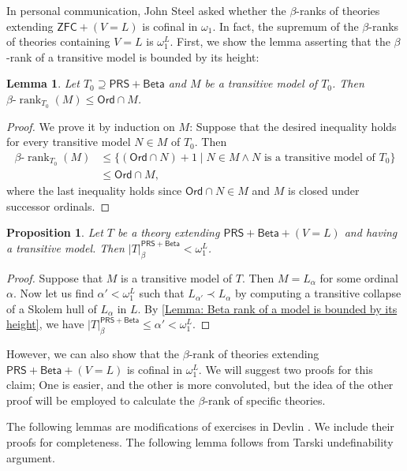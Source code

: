 \documentclass{amsart}
\newtheorem{lemma}[theorem]{Lemma}
\newtheorem{proposition}[proposition]{Proposition}
\theoremstyle{remark}
\newcommand{\PRS}{\mathsf{PRS}}
\newcommand{\Beta}{\mathsf{Beta}}
\newcommand{\betarank}{\beta\text{-}\operatorname{rank}}
\newcommand{\Ord}{\mathsf{Ord}}
\newcommand{\ZFC}{\mathsf{ZFC}}
\begin{document}
In personal communication, John Steel asked whether the $\beta$-ranks of theories extending $\ZFC + (V=L)$ is cofinal in $\omega_1$. In fact, the supremum of the $\beta$-ranks of theories containing $V=L$ is $\omega_1^L$. First, we show the lemma asserting that the $\beta$-rank of a transitive model is bounded by its height:
\begin{lemma} \label{Lemma: Beta rank of a model is bounded by its height}
    Let $T_0 \supseteq \PRS + \mathsf{Beta}$ and $M$ be a transitive model of $T_0$. Then $\betarank_{T_0}(M) \le \Ord\cap M$.
\end{lemma}
\begin{proof}
    We prove it by induction on $M$: Suppose that the desired inequality holds for every transitive model $N\in M$ of $T_0$. Then
    \begin{align*}
        \betarank_{T_0}(M) & \le \{(\Ord\cap N) + 1 \mid N\in M \land N\text{ is a transitive model of } T_0\} \\
        & \le \Ord\cap M,
    \end{align*}
    where the last inequality holds since $\Ord\cap N\in M$ and $M$ is closed under successor ordinals.
\end{proof}

\begin{proposition}
    Let $T$ be a theory extending $\PRS + \mathsf{Beta} + (V=L)$ and having a transitive model. Then $|T|^{\PRS+\Beta}_\beta < \omega_1^L$.
\end{proposition}
\begin{proof}
    Suppose that $M$ is a transitive model of $T$. Then $M = L_\alpha$ for some ordinal $\alpha$. Now let us find $\alpha'<\omega_1^L$ such that $L_{\alpha'}\prec L_\alpha$ by computing a transitive collapse of a Skolem hull of $L_\alpha$ in $L$. By \autoref{Lemma: Beta rank of a model is bounded by its height}, we have $|T|_{\beta}^{\PRS+\mathsf{Beta}} \le \alpha' < \omega_1^L$.
\end{proof}

However, we can also show that the $\beta$-rank of theories extending $\PRS + \mathsf{Beta} + (V=L)$ is cofinal in $\omega_1^L$. We will suggest two proofs for this claim; One is easier, and the other is more convoluted, but the idea of the other proof will be employed to calculate the $\beta$-rank of specific theories.

The following lemmas are modifications of exercises in Devlin \cite[Exercise II.3.B--3.D.]{Devlin1984Constructibility}. We include their proofs for completeness. The following lemma follows from Tarski undefinability argument.
\end{document}
